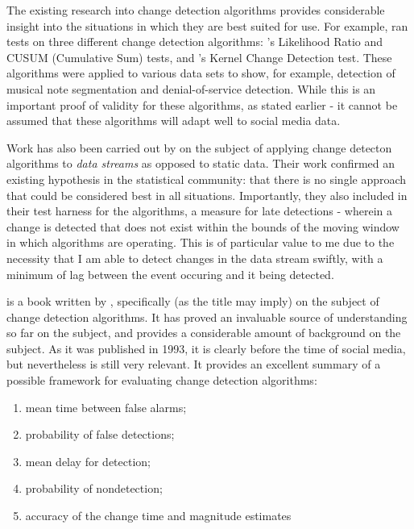 \documentclass{uvamscse}
\begin{document}
The existing research into change detection algorithms provides considerable insight into the situations in which they are best suited for use. For example, \citeauthor{BuntainChanges2014} ran tests on three different change detection algorithms: \citeauthor{galeano2007covariance}'s Likelihood Ratio and CUSUM (Cumulative Sum) tests\cite{galeano2007covariance}, and \citeauthor{desobry2005online}'s Kernel Change Detection test\cite{desobry2005online}. These algorithms were applied to various data sets to show, for example, detection of musical note segmentation and denial-of-service detection. While this is an important proof of validity for these algorithms, as stated earlier - it cannot be assumed that these algorithms will adapt well to social media data.

Work has also been carried out by \citeauthor{kifer2004detecting} on the subject of applying change detecton algorithms to \textit{data streams} as opposed to static data\cite{kifer2004detecting}. Their work confirmed an existing hypothesis in the statistical community: that there is no single approach that could be considered best in all situations. Importantly, they also included in their test harness for the algorithms, a measure for late detections - wherein a change is detected that does not exist within the bounds of the moving window in which algorithms are operating. This is of particular value to me due to the necessity that I am able to detect changes in the data stream swiftly, with a minimum of lag between the event occuring and it being detected.

 is a book written by \citeauthor{basseville1993detection}, specifically (as the title may imply) on the subject of change detection algorithms. It has proved an invaluable source of understanding so far on the subject, and provides a considerable amount of background on the subject. As it was published in 1993, it is clearly before the time of social media, but nevertheless is still very relevant. It provides an excellent summary of a possible framework for evaluating change detection algorithms\cite{basseville1993detection}:

\begin{enumerate}
	\item mean time between false alarms;
	\item probability of false detections;
	\item mean delay for detection;
	\item probability of nondetection;
	\item accuracy of the change time and magnitude estimates
\end{enumerate}
\end{document}
